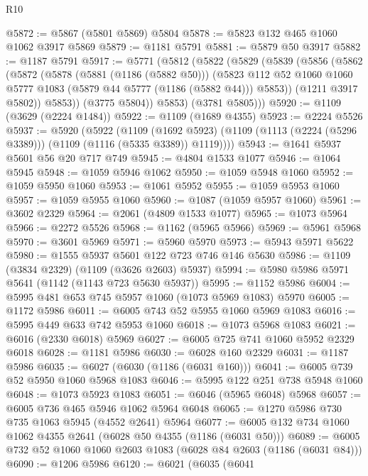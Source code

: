 \begin{lexlean}{R10}
\begin{coremodule}
@5872 := @5867 (@5801 @5869) @5804
@5878 := @5823 @132 @465 @1060 @1062 @3917 @5869
@5879 := @1181 @5791
@5881 := @5879 @50 @3917
@5882 := @1187 @5791
@5917 := @5771
    (@5812
      (@5822
        (@5829
          (@5839
            (@5856
              (@5862
                (@5872
                  (@5878
                    (@5881 (@1186 (@5882 @50)))
                    (@5823
                      @112
                      @52
                      @1060
                      @1060
                      @5777
                      @1083
                      (@5879 @44 @5777 (@1186 (@5882 @44)))
                      @5853))
                  (@1211 @3917 @5802))
                @5853))
            (@3775 @5804))
          @5853)
        (@3781 @5805)))
@5920 := @1109 (@3629 (@2224 @1484))
@5922 := @1109 (@1689 @4355)
@5923 := @2224 @5526
@5937 := @5920
    (@5922
      (@1109
        (@1692 @5923)
        (@1109 (@1113 (@2224 (@5296 @3389))) (@1109 (@1116 (@5335 @3389)) @1119))))
@5943 := @1641 @5937 @5601 @56 @20 @717 @749
@5945 := @4804 @1533 @1077
@5946 := @1064 @5945
@5948 := @1059 @5946 @1062
@5950 := @1059 @5948 @1060
@5952 := @1059 @5950 @1060
@5953 := @1061 @5952
@5955 := @1059 @5953 @1060
@5957 := @1059 @5955 @1060
@5960 := @1087 (@1059 @5957 @1060)
@5961 := @3602 @2329
@5964 := @2061 (@4809 @1533 @1077)
@5965 := @1073 @5964
@5966 := @2272 @5526
@5968 := @1162 (@5965 @5966)
@5969 := @5961 @5968
@5970 := @3601 @5969
@5971 := @5960 @5970
@5973 := @5943 @5971 @5622
@5980 := @1555 @5937 @5601 @122 @723 @746 @146 @5630
@5986 := @1109 (@3834 @2329) (@1109 (@3626 @2603) @5937)
@5994 := @5980 @5986 @5971 @5641 (@1142 (@1143 @723 @5630 @5937))
@5995 := @1152 @5986
@6004 := @5995 @481 @653 @745 @5957 @1060 (@1073 @5969 @1083) @5970
@6005 := @1172 @5986
@6011 := @6005 @743 @52 @5955 @1060 @5969 @1083
@6016 := @5995 @449 @633 @742 @5953 @1060
@6018 := @1073 @5968 @1083
@6021 := @6016 (@2330 @6018) @5969
@6027 := @6005 @725 @741 @1060 @5952 @2329 @6018
@6028 := @1181 @5986
@6030 := @6028 @160 @2329
@6031 := @1187 @5986
@6035 := @6027 (@6030 (@1186 (@6031 @160)))
@6041 := @6005 @739 @52 @5950 @1060 @5968 @1083
@6046 := @5995 @122 @251 @738 @5948 @1060
@6048 := @1073 @5923 @1083
@6051 := @6046 (@5965 @6048) @5968
@6057 := @6005 @736 @465 @5946 @1062 @5964 @6048
@6065 := @1270 @5986 @730 @735 @1063 @5945 (@4552 @2641) @5964
@6077 := @6005 @132 @734 @1060 @1062 @4355 @2641 (@6028 @50 @4355 (@1186 (@6031 @50)))
@6089 := @6005 @732 @52 @1060 @1060 @2603 @1083 (@6028 @84 @2603 (@1186 (@6031 @84)))
@6090 := @1206 @5986
@6120 := @6021
    (@6035
      (@6041

\end{coremodule}
\end{lexlean}
